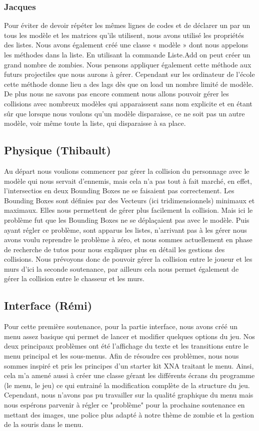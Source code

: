 \documentclass[12pt,a4paper]{article} %
\begin{document}
\subsubsection{Jacques}
Pour éviter de devoir répéter les mêmes lignes de codes et de déclarer un par un tous les modèle et les matrices qu’ils utilisent, nous avons utilisé les propriétés des listes. Nous avons également créé une classe « modèle » dont nous appelons les méthodes dans la liste. En utilisant la commande Liste.Add  on peut créer un grand nombre de zombies. Nous pensons appliquer également cette méthode aux futurs projectiles que nous aurons à gérer. Cependant sur les ordinateur de l’école cette méthode donne lieu a des lags dès que on load un nombre limité de modèle. De plus nous ne savons pas encore comment nous allons pouvoir gérer les collisions avec nombreux modèles qui apparaissent sans nom explicite et en étant sûr que lorsque nous voulons qu’un modèle disparaisse, ce ne soit pas un autre modèle, voir même toute la liste, qui disparaisse à sa place.

\newpage
\subsection {Physique (Thibault)}
Au départ nous voulions commencer par gérer la collision du personnage avec le modèle qui nous servait d'ennemis, mais cela n’a pas tout à fait marché, en effet, l’intersectios en deux Bounding Boxes ne se faisaient pas correctement. Les Bounding Boxes sont définies par des Vecteurs (ici tridimensionnels) minimaux et maximaux. Elles nous permettent de gérer plus facilement la collision. Mais ici le problème fut que les Bounding Boxes ne se déplaçaient pas avec le modèle. Puis ayant régler ce problème, sont apparus les listes, n’arrivant pas à les gérer nous avons voulu reprendre le problème à zéro, et nous sommes actuellement en phase de recherche de tutos pour nous expliquer plus en détail les gestions des collisions.
Nous prévoyons donc de pouvoir gérer la collision entre le joueur et les murs d'ici la seconde soutenance, par ailleurs cela nous permet également de gérer la collision entre le chasseur et les murs.
\subsection {Interface (Rémi)}
Pour cette première soutenance, pour la partie interface, nous avons créé un menu assez basique qui permet de lancer et modifier quelques options du jeu. Nos deux principaux problèmes ont été l'affichage du texte et les transitions entre le menu principal et les sous-menus. Afin de résoudre ces problèmes, nous nous sommes inspiré et pris les principes d'un starter kit XNA traitant le menu. Ainsi, cela m'a amené aussi à créer une classe gérant les différents écrans du programme (le menu, le jeu) ce qui entrainé la modification complète de la structure du jeu.
Cependant, nous n’avons pas pu travailler sur la qualité graphique du menu mais nous espérons parvenir à régler ce "problème" pour la prochaine soutenance en mettant des images, une police plus adapté à notre thème de zombie et la gestion de la souris dans le menu.
\newpage
\end{document}
